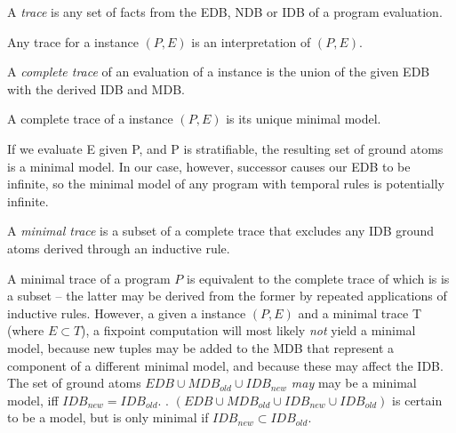 \begin{definition}
A \emph{trace} is any set of facts from the EDB, NDB or IDB of a \lang program evaluation.
\end{definition}

Any trace for a \lang instance $(P,E)$ is an interpretation of $(P,E)$.

\begin{definition}
%
A \emph{complete trace} of an evaluation of a \lang instance is the union of
the given EDB with the derived IDB and MDB.
%
\end{definition}

\begin{lemma}
%
A complete trace of a \lang instance $(P,E)$ is its unique minimal model.
%
\end{lemma}


If we evaluate E given P, and P is stratifiable, the resulting set of ground atoms is a minimal model.
In our case, however, successor causes our EDB to be infinite, so the minimal model of any \lang program 
with temporal rules is potentially infinite.  


\begin{definition}
A \emph{minimal trace} is a subset of a complete trace that excludes any IDB ground atoms derived through an inductive
rule.
\end{definition}

A minimal trace of a \lang program $P$ is equivalent to the complete trace of which is is a subset -- the latter may be derived from the former by repeated
applications of inductive rules.  However, a given a \lang instance $(P, E)$ and a minimal trace T (where $E \subset T$), a fixpoint
computation will most likely \emph{not} yield a minimal model, because new tuples may be added to the MDB that represent a component 
of a different minimal model, and because these may affect the IDB.  The set of ground atoms $EDB \cup MDB_{old} \cup IDB_{new}$
\emph{may} may be a minimal model, iff $IDB_{new} = IDB_{old}$.  .  
$(EDB \cup MDB_{old} \cup IDB_{new} \cup IDB_{old})$ is certain to be a model, but is only minimal if $IDB_{new} \subset IDB_{old}$.

